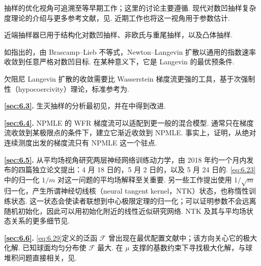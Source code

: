 抽样的优化视角可追溯至\cite{ref100}等早期工作；这里的讨论主要遵循\cite{ref324}. 现代对数凹抽样复杂度理论的介绍与更多参考文献，见\cite{ref76,ref77}. 近期工作也将这一视角用于参数估计\cite{ref6,ref64}.

近端抽样器已用于结构化对数凹抽样\cite{ref203}、非欧氏\cite{ref154}与重尾\cite{ref163}抽样，以及凸体抽样\cite{ref184}.

如\cite{ref80}指出的，由 Brascamp--Lieb 不等式\cite{ref54}，Newton--Langevin 扩散以通用的指数速率收敛到任意严格对数凹目标. 在某种意义下，它是 Langevin 的最优预条件\cite{ref96}.

欠阻尼 Langevin 扩散的收敛需要比 Wasserstein 梯度流更强的工具，基于次强制性（hypocoercivity）理论，标准参考为\cite{ref316}.

\noindent\textbf{\autoref{sec:6.3}.} 生灭抽样的分析最初见\cite{ref216}，并在\cite{ref217}中得到改进.

\noindent\textbf{\autoref{sec:6.4}.} NPMLE 的 WFR 梯度流可以适配到更一般的混合模型. 通常只在梯度流收敛到某极限点的条件下，建立它渐近收敛到 NPMLE. 事实上，\cite{ref327}证明，从绝对连续测度出发的梯度流只有 NPMLE 这一个驻点.

\noindent\textbf{\autoref{sec:6.5}.} 从平均场视角研究两层神经网络训练动力学，由 2018 年约一个月内发布的四篇独立论文提出：4 月 18 日的\cite{ref227}，5 月 2 日的\cite{ref288,ref275}，以及 5 月 24 日的\cite{ref83}. \eqref{eq:6.23}中的归一化 $1/m$ 对这一问题的平均场解释至关重要. 另一些工作提出使用 $1/\sqrt m$ 归一化，产生所谓神经切线核（neural tangent kernel，NTK）状态，也称惰性训练状态. 这一状态会使读者联想到中心极限定理的归一化；可以证明参数不会远离随机初始化，因此可以用初始化附近的线性近似研究网络\cite{ref167}. NTK 及其与平均场状态关系的更多细节见\cite{ref229}.

\noindent\textbf{\autoref{sec:6.6}.} \eqref{eq:6.29}定义的泛函 $\mathcal F$ 曾出现在最优配置文献中；该方向关心它的极大化解. 已知球面均匀分布使 $\mathcal F$ 最大\cite{ref300}. 在 $\mu$ 支撑的基数约束下寻找极大化解，与球堆积问题直接相关，见\cite{ref91}.
